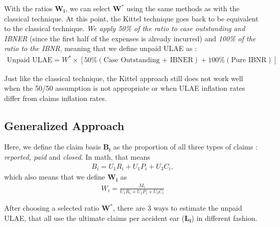 \documentclass[11pt, english]{memoir}
\numberwithin{definition}{section}
\begin{document}
	With the ratios $ \mathbf{W_{i}} $, we can select $ \mathbf{W^{*}} $ using the same methods as with the classical technique. At this point, the Kittel technique goes back to be equivalent to the classical technique. \emph{We apply 50\% of the ratio to case outstanding and IBNER} (since the first half of the expenses is already incurred) and \emph{100\% of the ratio to the IBNR}, meaning that we define unpaid ULAE as :
	\begin{align*}
	\text{Unpaid ULAE} = W^{*}\times\left[50\%(\text{Case Outstanding + IBNER}) + 100\%(\text{Pure IBNR}) \right]
	\end{align*}
	
	Just like the classical technique, the Kittel approach still does not work well when the 50/50 assumption is not appropriate or when ULAE	inflation rates differ from claims inflation rates.\\
	
	
	
	
	
	
	
\subsection{Generalized Approach}
	Here, we define the claim basis $ \mathbf{B_{i}} $ as the proportion of all three types of claims : \emph{reported, paid} and \emph{closed}. In math, that means
	\begin{align*}
	B_{i} = U_{1}R_{i} + U_{1}P_{i} + U_{3}C_{i},
	\end{align*}
	which also means that we define $ \mathbf{W_{i}} $ as 
	\begin{align*}
	W_{i} = \frac{M_{i}}{U_{1}R_{i} + U_{1}P_{i} + U_{3}C_{i}}
	\end{align*}
	
	After choosing a selected ratio $ \mathbf{W^{*}} $, there are 3 ways to estimate the unpaid ULAE, that all use the ultimate claims per accident ear ($ \mathbf{L_{i}} $) in different fashion.
	
\end{document}
